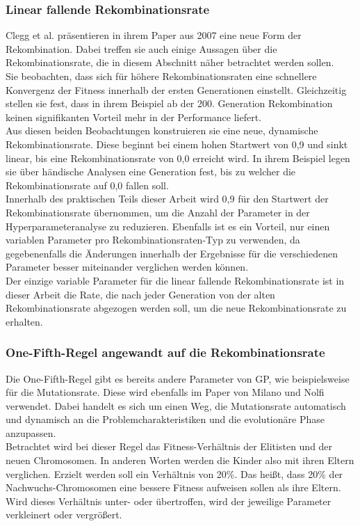 \subsubsection{Linear fallende Rekombinationsrate}
\label{subsubsec:CleggCrossover}

Clegg et al. präsentieren in ihrem Paper aus 2007 eine neue Form der Rekombination.
Dabei treffen sie auch einige Aussagen über die Rekombinationsrate, die in diesem Abschnitt näher betrachtet werden sollen.\cite{clegg_new_2007}\\
Sie beobachten, dass sich für höhere Rekombinationsraten eine schnellere Konvergenz der Fitness innerhalb der ersten Generationen einstellt.
Gleichzeitig stellen sie fest, dass in ihrem Beispiel ab der 200. Generation Rekombination keinen signifikanten Vorteil mehr in der Performance liefert.\\
Aus diesen beiden Beobachtungen konstruieren sie eine neue, dynamische Rekombinationsrate.
Diese beginnt bei einem hohen Startwert von 0,9 und sinkt linear, bis eine Rekombinationsrate von 0,0 erreicht wird. 
In ihrem Beispiel legen sie über händische Analysen eine Generation fest, bis zu welcher die Rekombinationsrate auf 0,0 fallen soll.\\
Innerhalb des praktischen Teils dieser Arbeit wird 0,9 für den Startwert der Rekombinationsrate übernommen, um die Anzahl der Parameter in der Hyperparameteranalyse zu reduzieren.
Ebenfalls ist es ein Vorteil, nur einen variablen Parameter pro Rekombinationsraten-Typ zu verwenden, da gegebenenfalls die Änderungen innerhalb der Ergebnisse für die verschiedenen Parameter besser miteinander verglichen werden können.\\
Der einzige variable Parameter für die linear fallende Rekombinationsrate ist in dieser Arbeit die Rate, die nach jeder Generation von der alten Rekombinationsrate abgezogen werden soll, um die neue Rekombinationsrate zu erhalten.

\subsubsection{One-Fifth-Regel angewandt auf die Rekombinationsrate}
\label{subsubsec:oneFifthCrossover}

Die One-Fifth-Regel gibt es bereits andere Parameter von GP, wie beispielsweise für die Mutationsrate.
Diese wird ebenfalls im Paper von Milano und Nolfi verwendet.
Dabei handelt es sich um einen Weg, die Mutationsrate automatisch und dynamisch an die Problemcharakteristiken und die evolutionäre Phase anzupassen. \cite{milano_scaling_2018}\\
Betrachtet wird bei dieser Regel das Fitness-Verhältnis der Elitisten und der neuen Chromosomen.
In anderen Worten werden die Kinder also mit ihren Eltern verglichen.
Erzielt werden soll ein Verhältnis von 20\%.
Das heißt, dass 20\% der Nachwuchs-Chromosomen eine bessere Fitness aufweisen sollen als ihre Eltern.
Wird dieses Verhältnis unter- oder übertroffen, wird der jeweilige Parameter verkleinert oder vergrößert. \cite{doerr_self-adjusting_2019}\\


